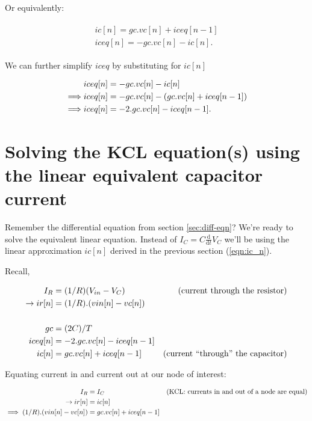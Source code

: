 \documentclass{article}
\begin{document}
Or equivalently:

\begin{eqnarray} \begin{array}{l}
\label{eqn:ic_n}
ic[n] = gc . vc[n] + iceq[n-1]\\
iceq[n] = - gc . vc[n] - ic[n].
\end{array} \end{eqnarray}

We can further simplify $iceq$ by substituting for $ic[n]$

\begin{align}
&iceq[n] = - gc . vc[n] - ic[n] \notag\\
\implies &iceq[n] = - gc . vc[n] - (gc . vc[n] + iceq[n-1])\notag\\
\implies &iceq[n] = -2 . gc . vc[n] - iceq[n-1].
\end{align}


\section{Solving the KCL equation(s) using the linear equivalent capacitor current}

Remember the differential equation from section \ref{sec:diff-eqn}?
We're ready to solve the equivalent linear equation. Instead of 
$I_C = C\frac{\mathrm{d}}{\mathrm{d}t}V_C$
we'll be using the linear approximation $ic[n]$ derived in the previous section (\ref{eqn:ic_n}).

Recall,

\begin{equation}
\begin{aligned}
		   I_R &= (1/R) (V_{in} - V_C)	 	&\text{(current through the resistor)} \\
\to	     ir[n] &= (1/R) . (vin[n] - vc[n])\\
\\
	      	gc &= (2C)/T \hspace{.1\textwidth}& \\
	      	iceq[n] &= -2 . gc . vc[n] - iceq[n-1] \\
	     ic[n] &= gc . vc[n] + iceq[n-1]    &\text{(current ``through'' the capacitor)}
\end{aligned}
\end{equation}

Equating current in and current out at our node of interest:

\begin{equation}
\begin{aligned}
                   I_R &= I_C	 	&\text{(KCL: currents in and out of a node are equal)} \\
\to                 ir[n] &= ic[n]	\hspace{.1\textwidth}& \\
\implies (1/R) . (vin[n] - vc[n]) &= gc . vc[n] + iceq[n-1] &
\end{aligned}
\end{equation}
\end{document}
